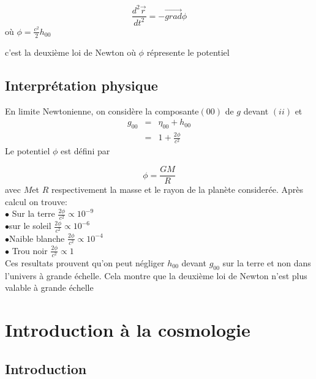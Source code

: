 \documentclass[a4paper,12pt]{report}
\theoremstyle{plain}
\theoremstyle{plain}
\begin{document}
\begin{equation}
 \frac{d^2 \vec r}{dt^2}=- \vec{grad}\phi  
 \end{equation}
o\`u $\phi=\frac{c^2}{2}h_{00}$

c'est la deuxi\`eme loi de Newton o\`u $\phi$ r\'epresente le potentiel \\
\section{Interpr\'etation physique}
En limite Newtonienne,  on consid\`ere la composante$(00)$ de $g$ devant $(ii)$ et 
\begin{eqnarray}
 g_{00}&=& \eta_{00}+ h_{00}\\
 &=&1+\frac{2\phi}{c^2}
\end{eqnarray}
Le potentiel $\phi$ est d\'efini  par 

\begin{equation}
 \phi=\frac{GM}{R}
\end{equation}
avec $M$et $R$ respectivement la masse et le rayon de la plan\`ete consider\'ee.  Apr\`es calcul on trouve:\\
$\bullet$ Sur la terre $\frac{2\phi}{c^2}\propto 10^{-9}$\\
$\bullet$sur le soleil $\frac{2\phi}{c^2} \propto 10^{-6}$\\
$\bullet$Naible  blanche $\frac{2\phi}{c^2}\propto 10^{-4}$\\
$\bullet$ Trou noir $\frac{2\phi}{c^2} \propto  1$\\
Ces resultats prouvent qu'on peut  n\'egliger  $ h_{00}$ devant $ g_{00}$ sur la terre  et non dans l'univers \`a grande \'echelle.  Cela 
montre que la deuxi\`eme loi de Newton n'est plus valable \`a grande \'echelle
 
 
 
 \chapter{Introduction à la cosmologie} \label{chapitre3}
 \minitoc
 \section{Introduction}
 
\end{document}
